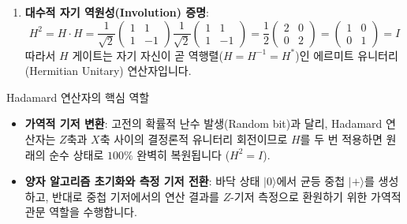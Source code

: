 \documentclass[11pt, a4paper]{article}
\newcommand{\ket}[1]{|#1\rangle}
\theoremstyle{definition}
\begin{document}
\begin{enumerate}
    \item \textbf{대수적 자기 역원성(Involution) 증명}:
    $$H^2 = H \cdot H = \frac{1}{\sqrt{2}}\begin{pmatrix} 1 & 1 \\ 1 & -1 \end{pmatrix} \frac{1}{\sqrt{2}}\begin{pmatrix} 1 & 1 \\ 1 & -1 \end{pmatrix} = \frac{1}{2}\begin{pmatrix} 2 & 0 \\ 0 & 2 \end{pmatrix} = \begin{pmatrix} 1 & 0 \\ 0 & 1 \end{pmatrix} = I$$
    따라서 $H$ 게이트는 자기 자신이 곧 역행렬($H = H^{-1} = H^*$)인 에르미트 유니터리(Hermitian Unitary) 연산자입니다.
\end{enumerate}

\begin{notebox}{Hadamard 연산자의 핵심 역할}
\begin{itemize}
    \item \textbf{가역적 기저 변환}: 고전의 확률적 난수 발생(Random bit)과 달리, Hadamard 연산자는 $Z$축과 $X$축 사이의 결정론적 유니터리 회전이므로 $H$를 두 번 적용하면 원래의 순수 상태로 $100\%$ 완벽히 복원됩니다 ($H^2 = I$).
    \item \textbf{양자 알고리즘 초기화와 측정 기저 전환}: 바닥 상태 $\ket{0}$에서 균등 중첩 $\ket{+}$를 생성하고, 반대로 중첩 기저에서의 연산 결과를 $Z$-기저 측정으로 환원하기 위한 가역적 관문 역할을 수행합니다.
\end{itemize}
\end{notebox}
\end{document}
